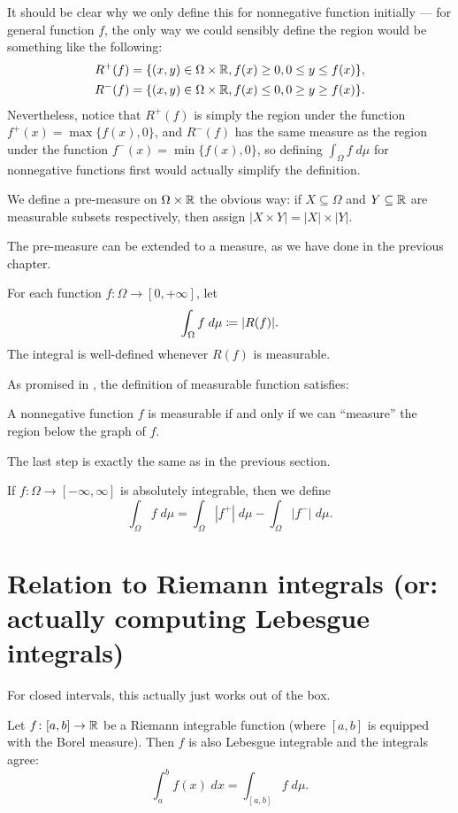\begin{remark}
	It should be clear why we only define this for nonnegative function initially ---
	for general function $f$, the only way we could sensibly define the region would be something like
	the following:
	\begin{align*}
		R^+(f) &= \{(x, y) \in \Omega \times \mathbb R, f(x) \geq 0, 0 \leq y \leq f(x)\}, \\
		R^-(f) &= \{(x, y) \in \Omega \times \mathbb R, f(x) \leq 0, 0 \geq y \geq f(x)\}.
	\end{align*}
	Nevertheless, notice that $R^+(f)$ is simply the region under the function
	$f^+(x) = \max\{ f(x), 0 \}$, and $R^-(f)$ has the same measure as the region under the function
	$f^-(x) = \min\{ f(x), 0 \}$, so defining $\int_\Omega f \; d\mu$ for nonnegative functions first
	would actually simplify the definition.
\end{remark}

\begin{step}
	We define a pre-measure on $\Omega \times \mathbb R$ the obvious way:
	if $X \subseteq \Omega$ and $Y \subseteq \mathbb R$ are measurable subsets respectively,
	then assign $|X \times Y| = |X| \times |Y|$.

	The pre-measure can be extended to a measure, as we have done in the previous chapter.
\end{step}

\begin{step}
	For each function $f \colon \Omega \to [0, +\infty]$, let
	\[ \int_\Omega f \; d\mu \coloneqq |R(f)|. \]
	The integral is well-defined whenever $R(f)$ is measurable.
\end{step}
As promised in , the definition of measurable function satisfies:
\begin{moral}
	A nonnegative function $f$ is measurable if and only if we can ``measure'' the region below the graph
	of $f$.
\end{moral}

The last step is exactly the same as in the previous section.
\begin{step}
	If $f \colon \Omega \to [-\infty, \infty]$ is absolutely integrable,
	then we define
	\[ \int_\Omega f \; d\mu = \int_\Omega |f^+| \; d\mu
		- \int_\Omega |f^-| \; d\mu. \]
\end{step}

\section{Relation to Riemann integrals (or: actually computing Lebesgue integrals)}
For closed intervals, this actually just works out of the box.
\begin{theorem}
	Let $f \colon [a,b] \to \mathbb R$ be a Riemann integrable function
	(where $[a,b]$ is equipped with the Borel measure).
	Then $f$ is also Lebesgue integrable and the integrals agree:
	\[ \int_a^b f(x) \; dx = \int_{[a,b]} f \; d\mu. \]
\end{theorem}

